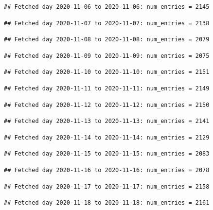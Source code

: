 \documentclass[]{article}
\begin{document}
\begin{verbatim}
## Fetched day 2020-11-06 to 2020-11-06: num_entries = 2145
\end{verbatim}

\begin{verbatim}
## Fetched day 2020-11-07 to 2020-11-07: num_entries = 2138
\end{verbatim}

\begin{verbatim}
## Fetched day 2020-11-08 to 2020-11-08: num_entries = 2079
\end{verbatim}

\begin{verbatim}
## Fetched day 2020-11-09 to 2020-11-09: num_entries = 2075
\end{verbatim}

\begin{verbatim}
## Fetched day 2020-11-10 to 2020-11-10: num_entries = 2151
\end{verbatim}

\begin{verbatim}
## Fetched day 2020-11-11 to 2020-11-11: num_entries = 2149
\end{verbatim}

\begin{verbatim}
## Fetched day 2020-11-12 to 2020-11-12: num_entries = 2150
\end{verbatim}

\begin{verbatim}
## Fetched day 2020-11-13 to 2020-11-13: num_entries = 2141
\end{verbatim}

\begin{verbatim}
## Fetched day 2020-11-14 to 2020-11-14: num_entries = 2129
\end{verbatim}

\begin{verbatim}
## Fetched day 2020-11-15 to 2020-11-15: num_entries = 2083
\end{verbatim}

\begin{verbatim}
## Fetched day 2020-11-16 to 2020-11-16: num_entries = 2078
\end{verbatim}

\begin{verbatim}
## Fetched day 2020-11-17 to 2020-11-17: num_entries = 2158
\end{verbatim}

\begin{verbatim}
## Fetched day 2020-11-18 to 2020-11-18: num_entries = 2161
\end{verbatim}
\end{document}
